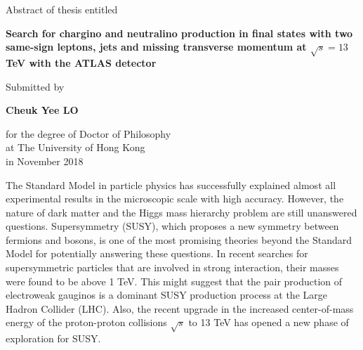 {}

\begin{center}

Abstract of thesis entitled\\

\bigskip

    \huge\textbf{Search for chargino and neutralino production in final states with two same-sign leptons, jets and missing transverse momentum at $\sqrt{s} = 13$ TeV with the ATLAS detector} \\

    \bigskip

    {\normalsize Submitted by}\\

\bigskip

    \Large{\textbf{Cheuk Yee LO}}\\

\bigskip

{\normalsize
for the degree of Doctor of Philosophy\\
at The University of Hong Kong\\
in November 2018\\}

\end{center}

\bigskip

The Standard Model in particle physics has successfully explained almost all experimental results in the microscopic scale with high accuracy.
However, the nature of dark matter and the Higgs mass hierarchy problem are still unanswered questions.
Supersymmetry (SUSY), which proposes a new symmetry between fermions and bosons, is one of the most promising theories beyond the Standard Model for potentially answering these questions.
In recent searches for supersymmetric particles that are involved in strong interaction, their masses were found to be above 1 TeV.
This might suggest that the pair production of electroweak gauginos is a dominant SUSY production process at the Large Hadron Collider (LHC).
Also, the recent upgrade in the increased center-of-mass energy of the proton-proton collisions $\sqrt{s}$ to 13 TeV has opened a new phase of exploration for SUSY.

